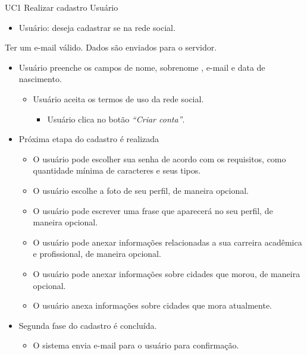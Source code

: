 \casoDeUso
{UC1}
{Realizar cadastro}
{Usuário}
{
\begin{itemize}
	\item Usuário: deseja cadastrar se na rede social.	
\end{itemize}

}
{Ter um e-mail válido.}
{Dados são enviados para o servidor.}
{
\begin{itemize}
	\item Usuário preenche os campos de nome, sobrenome , e-mail e data de nascimento.
	\begin{itemize}
		\item Usuário aceita os termos de uso da rede social.	
		\begin{itemize}
			\item Usuário clica no botão \textit{“Criar conta”}.
		\end{itemize}
	\end{itemize}
	
	
	\item Próxima etapa do cadastro é realizada
	\begin{itemize}
		
		\item O usuário pode escolher sua senha de acordo com   os requisitos, como quantidade mínima de caracteres e seus tipos.
		\item O usuário escolhe a foto de seu perfil, de maneira opcional.
		\item O usuário pode escrever uma frase que aparecerá no seu perfil, de maneira opcional.
		
		\item O usuário pode anexar informações relacionadas a sua carreira acadêmica e profissional, de maneira opcional.
		
		\item O usuário pode anexar informações sobre cidades que morou, de maneira opcional.
		
		\item O usuário anexa informações sobre cidades que mora atualmente.
		
		
	\end{itemize}
\item Segunda fase do cadastro é concluída.
\begin{itemize}
			
			\item O sistema envia e-mail para o usuário para confirmação.
		\end{itemize}	
\end{itemize}
}
